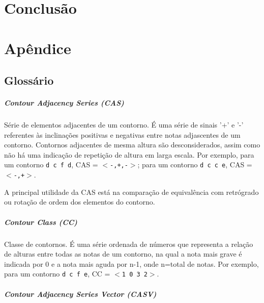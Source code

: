 \documentclass[12pt,brazil]{book}
\begin{document}
\chapter{Conclusão}
\label{cha:conclusao}





\chapter{Apêndice}
\label{cha:apendice}

\section{Glossário}
\label{sec:glossario}

\paragraph{Contour Adjacency Series (CAS)}
\label{sec:cont-adjac-seri}

Série de elementos adjacentes de um contorno. É uma série de sinais
'+' e '-' referentes às inclinações positivas e negativas entre notas
adjascentes de um contorno. Contornos adjacentes de mesma altura são
desconsiderados, assim como não há uma indicação de repetição de
altura em larga escala. Por exemplo, para um contorno \texttt{d c f
  d}, CAS = \texttt{$<$-,+,-$>$}; para um contorno \texttt{d c c e}, CAS =
\texttt{$<$-,+$>$}.

A principal utilidade da CAS está na comparação de equivalência com
retrógrado ou rotação de ordem dos elementos do contorno.

\paragraph{Contour Class (CC)}
\label{sec:contour-class-cc}

Classe de contornos. É uma série ordenada de números que representa a
relação de alturas entre todas as notas de um contorno, na qual a nota
mais grave é indicada por 0 e a nota mais aguda por n-1, onde n=total
de notas. Por exemplo, para um contorno \texttt{d c f e}, CC = \texttt{$<$1 0
3 2$>$}.

\paragraph{Contour Adjacency Series Vector (CASV)}
\label{sec:cont-adjac-seri-1}
\end{document}

